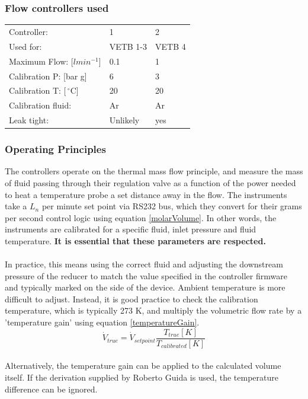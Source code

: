 \documentclass{report}
\begin{document}
\subsubsection{Flow controllers used}
\begin{tabular}{ p{2.4cm} | l l }
Controller: & 1 & 2\\
Used for: & VETB 1-3 & VETB 4 \\
Maximum Flow: [$lmin^{-1}$]& 0.1 & 1 \\
Calibration P: [bar g]& 6 & 3 \\
Calibration T: [$\,^{\circ}\mathrm{C}$]& 20 & 20\\
Calibration fluid: & Ar & Ar\\
Leak tight: & Unlikely & yes\\
\end{tabular}
 
\subsubsection{Operating Principles} \label{sec:operatingPrinciples}
The controllers operate on the thermal mass flow principle, and measure the mass of fluid passing through their regulation valve as a function of the power needed to heat a temperature probe a set distance away in the flow. \cite{bronkhorst} The instruments take a $L_n$ per minute set point via RS232 bus, which they convert for their grams per second control logic using equation \eqref{molarVolume}. In other words, the instruments are calibrated for a specific fluid, inlet pressure and fluid temperature. \textbf{It is essential that these parameters are respected.}\\
\\
In practice, this means using the correct fluid and adjusting the downstream pressure of the reducer to match the value specified in the controller firmware and typically marked on the side of the device. Ambient temperature is more difficult to adjust. Instead, it is good practice to check the calibration temperature, which is typically 273 K, and multiply the volumetric flow rate by a 'temperature gain' using equation \eqref{temperatureGain}.
\begin{equation} \label{temperatureGain}
\dot{V}_{true} = \dot{V}_{set point}\frac{T_{true}[K]}{T_{calibrated}[K]}
\end{equation}
\\
Alternatively, the temperature gain can be applied to the calculated volume itself. If the derivation supplied by Roberto Guida is used, the temperature difference can be ignored. \\
\end{document}
